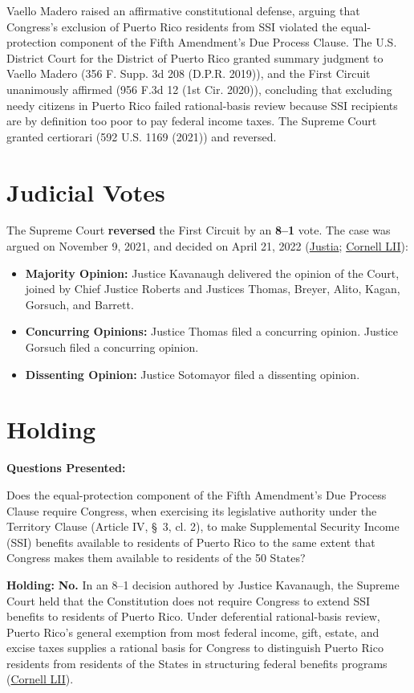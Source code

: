 \documentclass[12pt]{article}
\begin{document}
Vaello Madero raised an affirmative constitutional defense, arguing that Congress's exclusion of Puerto Rico residents from SSI violated the equal-protection component of the Fifth Amendment's Due Process Clause. The U.S. District Court for the District of Puerto Rico granted summary judgment to Vaello Madero (356 F. Supp. 3d 208 (D.P.R. 2019)), and the First Circuit unanimously affirmed (956 F.3d 12 (1st Cir. 2020)), concluding that excluding needy citizens in Puerto Rico failed rational-basis review because SSI recipients are by definition too poor to pay federal income taxes. The Supreme Court granted certiorari (592 U.S. 1169 (2021)) and reversed.

\section{Judicial Votes}
The Supreme Court \textbf{reversed} the First Circuit by an \textbf{8--1} vote. The case was argued on November 9, 2021, and decided on April 21, 2022 (\href{https://supreme.justia.com/cases/federal/us/596/20-303/}{Justia}; \href{https://www.law.cornell.edu/supremecourt/text/20-303}{Cornell LII}):

\begin{itemize}
    \item \textbf{Majority Opinion:} Justice Kavanaugh delivered the opinion of the Court, joined by Chief Justice Roberts and Justices Thomas, Breyer, Alito, Kagan, Gorsuch, and Barrett.
    \item \textbf{Concurring Opinions:} Justice Thomas filed a concurring opinion. Justice Gorsuch filed a concurring opinion.
    \item \textbf{Dissenting Opinion:} Justice Sotomayor filed a dissenting opinion.
\end{itemize}

\section{Holding}
\textbf{Questions Presented:}

Does the equal-protection component of the Fifth Amendment's Due Process Clause require Congress, when exercising its legislative authority under the Territory Clause (Article IV, \S~3, cl. 2), to make Supplemental Security Income (SSI) benefits available to residents of Puerto Rico to the same extent that Congress makes them available to residents of the 50 States?

\textbf{Holding:} \textbf{No.} In an 8--1 decision authored by Justice Kavanaugh, the Supreme Court held that the Constitution does not require Congress to extend SSI benefits to residents of Puerto Rico. Under deferential rational-basis review, Puerto Rico's general exemption from most federal income, gift, estate, and excise taxes supplies a rational basis for Congress to distinguish Puerto Rico residents from residents of the States in structuring federal benefits programs (\href{https://www.law.cornell.edu/supremecourt/text/20-303}{Cornell LII}).
\end{document}
